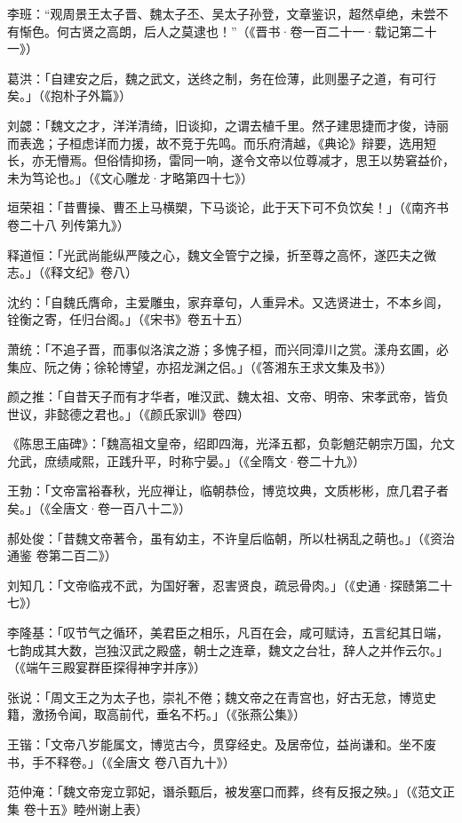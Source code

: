 李班：“观周景王太子晋、魏太子丕、吴太子孙登，文章鉴识，超然卓绝，未尝不有惭色。何古贤之高朗，后人之莫逮也！”（《晋书·卷一百二十一·载记第二十一》）

葛洪：「自建安之后，魏之武文，送终之制，务在俭薄，此则墨子之道，有可行矣。」（《抱朴子外篇》）

刘勰：「魏文之才，洋洋清绮，旧谈抑，之谓去植千里。然子建思捷而才俊，诗丽而表逸；子桓虑详而力援，故不竞于先鸣。而乐府清越，《典论》辩要，选用短长，亦无懵焉。但俗情抑扬，雷同一响，遂令文帝以位尊减才，思王以势窘益价，未为笃论也。」（《文心雕龙·才略第四十七》）

垣荣祖：「昔曹操、曹丕上马横槊，下马谈论，此于天下可不负饮矣！」（《南齐书 卷二十八 列传第九》）

释道恒：「光武尚能纵严陵之心，魏文全管宁之操，折至尊之高怀，遂匹夫之微志。」（《释文纪》卷八）

沈约：「自魏氏膺命，主爱雕虫，家弃章句，人重异术。又选贤进士，不本乡闾，铨衡之寄，任归台阁。」（《宋书》卷五十五）

萧统：「不追子晋，而事似洛滨之游；多愧子桓，而兴同漳川之赏。漾舟玄圃，必集应、阮之俦；徐轮博望，亦招龙渊之侣。」（《答湘东王求文集及书》）

颜之推：「自昔天子而有才华者，唯汉武、魏太祖、文帝、明帝、宋孝武帝，皆负世议，非懿德之君也。」（《颜氏家训》卷四）

《陈思王庙碑》：「魏高祖文皇帝，绍即四海，光泽五都，负彰魈茫朝宗万国，允文允武，庶绩咸熙，正践升平，时称宁晏。」（《全隋文·卷二十九》）

王勃：「文帝富裕春秋，光应禅让，临朝恭俭，博览坟典，文质彬彬，庶几君子者矣。」（《全唐文·卷一百八十二》）

郝处俊：「昔魏文帝著令，虽有幼主，不许皇后临朝，所以杜祸乱之萌也。」（《资治通鉴 卷第二百二》）

刘知几：「文帝临戎不武，为国好奢，忍害贤良，疏忌骨肉。」（《史通·探赜第二十七》）

李隆基：「叹节气之循环，美君臣之相乐，凡百在会，咸可赋诗，五言纪其日端，七韵成其大数，岂独汉武之殿盛，朝士之连章，魏文之台壮，辞人之并作云尔。」（《端午三殿宴群臣探得神字并序》）

张说：「周文王之为太子也，崇礼不倦；魏文帝之在青宫也，好古无怠，博览史籍，激扬令闻，取高前代，垂名不朽。」（《张燕公集》）

王锴：「文帝八岁能属文，博览古今，贯穿经史。及居帝位，益尚谦和。坐不废书，手不释卷。」（《全唐文 卷八百九十》）

范仲淹：「魏文帝宠立郭妃，谮杀甄后，被发塞口而葬，终有反报之殃。」（《范文正集 卷十五》睦州谢上表）

